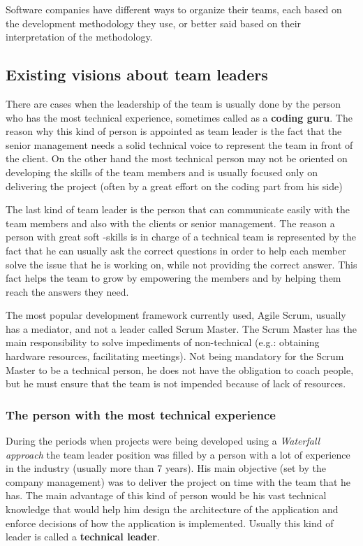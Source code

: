 
Software companies have different ways to organize their teams, each based on the development methodology they use, or better said based on their interpretation of the methodology.
\subsection{Existing visions about team leaders}
\label{sub-sec:existingvisionsaboutteamleaders}

There are cases when the leadership of the team is usually done by the person who has the most technical experience, sometimes called as a \textbf{coding guru}. The reason why this kind of person is appointed as team leader is the fact that  the senior management needs a solid technical voice to represent the team in front of the client. On the other hand the most technical person may not be oriented on developing the skills of the team members and is usually focused only on delivering the project (often by a great effort on the coding part from his side)

The last kind of team leader is the person that can communicate easily with the team members and also with the clients or senior management. The reason a person with great soft -skills is in charge of a technical team is represented by the fact that he can usually ask the correct questions in order to help each member solve the issue that he is working on, while not providing the correct answer. This fact helps the team to grow by empowering the members and by helping them reach the answers they need.

The most popular development framework currently used, Agile Scrum, usually has a mediator, and not a leader called Scrum Master. The Scrum Master has the main responsibility  to solve impediments of non-technical (e.g.: obtaining hardware resources, facilitating meetings). Not being mandatory for the Scrum Master to be a technical person, he does not have the obligation to coach people, but he must ensure that the team is not impended because of lack of resources.

\subsubsection{The person with the most technical experience}

During the periods when projects were being developed using a \textit{Waterfall approach} the team leader position was filled by a person with a lot of experience in the industry (usually more than 7 years). His main objective (set by the company management) was to deliver the project on time with the team that he has. The main advantage of this kind of person would be his vast technical knowledge that would help him design the architecture of the application and enforce decisions of how the application is implemented. Usually this kind of leader is called a \textbf{technical leader}.

